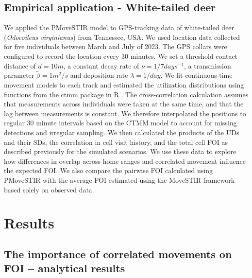 \documentclass[letterpaper]{article}
\begin{document}
\subsection*{Empirical application - White-tailed deer}

We applied the PMoveSTIR model to GPS-tracking data of white-tailed deer (\emph{Odocoileus virginianus}) from Tennessee, USA.
We used location data collected for five individuals between March and July of 2023. The GPS collars were configured to record the location every 30 minutes.
We set a threshold contact distance of $d=10 m$, a constant decay rate of $\nu=1/7 days^{-1}$, a transmission parameter $\tilde\beta=1 m^2/s$ and deposition rate $\lambda=1/day$.
We fit continuous-time movement models to each track and estimated the utilization distributions using functions from the ctmm package in R \citep{Calabrese2016}. The cross-correlation calculation assumes that measurements across individuals were taken at the same time, and that the lag between measurements is constant. We therefore interpolated the positions to regular 30 minute intervals based on the CTMM model to account for missing detections and irregular sampling. 
We then calculated the products of the UDs and their SDs, the correlation in cell visit history, and the total cell FOI as described previously for the simulated scenarios. 
We use these data to explore how differences in overlap across home ranges and  correlated movement influence the expected FOI. 
We also compare the pairwise FOI calculated using PMoveSTIR with the average FOI estimated using the MoveSTIR framework based solely on observed data. 

\section*{Results}

\subsection*{The importance of correlated movements on FOI -- analytical results}
\end{document}
